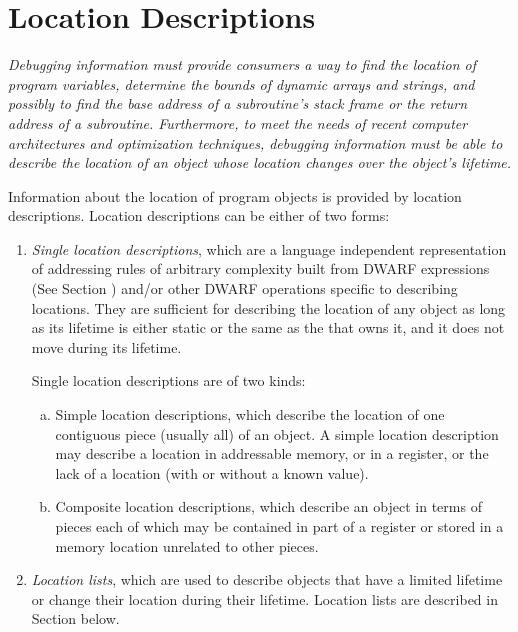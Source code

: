\section{Location Descriptions}
\label{chap:locationdescriptions}
\textit{Debugging information 
must 
provide consumers a way to find
the location of program variables, determine the bounds
of dynamic arrays and strings, and possibly to find the
base address of a subroutine\textquoteright s stack frame or the return
address of a subroutine. Furthermore, to meet the needs of
recent computer architectures and optimization techniques,
debugging information must be able to describe the location of
an object whose location changes over the object\textquoteright s lifetime.}

Information about the location of program objects is provided
by location descriptions. Location descriptions can be either
of two forms:
\begin{enumerate}[1. ]
\item \textit{Single location descriptions}, 
which 
are 
a language independent representation of
addressing rules of arbitrary complexity built from 
DWARF expressions (See Section ) 
and/or other
DWARF operations specific to describing locations. They are
sufficient for describing the location of any object as long
as its lifetime is either static or the same as the 
 that owns it, 
and it does not move during its lifetime.

Single location descriptions are of two kinds:
\begin{enumerate}[a) ]
\item Simple location descriptions, which describe the location
of one contiguous piece (usually all) of an object. A simple
location description may describe a location in addressable
memory, or in a register, or the lack of a location (with or
without a known value).

\item  Composite location descriptions, which describe an
object in terms of pieces each of which may be contained in
part of a register or stored in a memory location unrelated
to other pieces.

\end{enumerate}

\item \textit{Location lists}, which are used to 
describe
objects that have a limited lifetime or change their location
during their lifetime. Location lists are described in
Section  below.

\end{enumerate}

